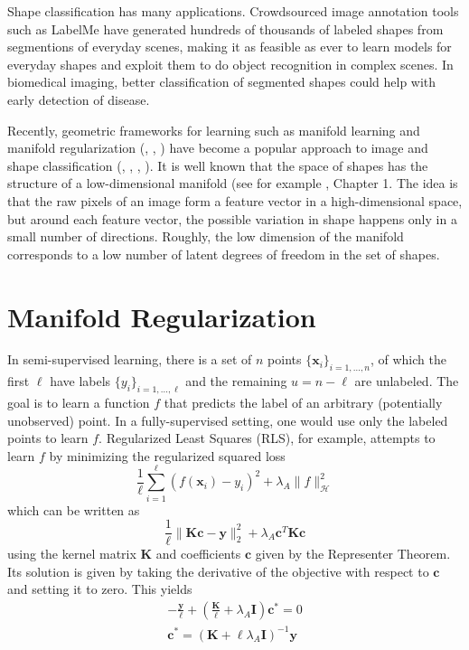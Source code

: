 \documentclass[anon,11pt]{9520} %
\newcommand{\mb}{\mathbf}
\begin{document}
Shape classification has many applications. Crowdsourced image annotation tools
such as LabelMe \cite{LabelMe} have generated hundreds of thousands of labeled
shapes from segmentions of everyday scenes, making it as feasible as ever to
learn models for everyday shapes and exploit them to do object recognition in
complex scenes. In biomedical imaging, better classification of segmented shapes
could help with early detection of disease.

Recently, geometric frameworks for learning such as manifold learning and
manifold regularization (\cite{Belkin1}, \cite{Belkin2}, \cite{Belkin3}) have become a
popular approach to image and shape classification
(\cite{sdf}, \cite{Tuzel}, \cite{Zhu}, \cite{Gong}). It is well known that the space of
shapes has the structure of a low-dimensional manifold (see for example
\cite{Haykin}, Chapter 1. The idea is that the raw pixels of an image form a
feature vector in a high-dimensional space, but around each feature vector, the
possible variation in shape happens only in a small number of
directions. Roughly, the low dimension of the manifold corresponds to a low
number of latent degrees of freedom in the set of shapes.

\begin{comment}
\begin{figure}
\begin{center}
\texttt{[image: fig/img\_overlay]}
\end{center}
\end{figure}
\end{comment}

\section{Manifold Regularization}
In semi-supervised learning, there is a set of $n$ points $\{\mb
x_i\}_{i=1,\dots,n}$, of which the first $\ell$ have labels
$\{y_i\}_{i=1,\dots,\ell}$ and the remaining $u=n-\ell$ are unlabeled. The goal
is to learn a function $f$ that predicts the label of an arbitrary (potentially
unobserved) point. In a fully-supervised setting, one would use only the labeled
points to learn $f$. Regularized Least Squares (RLS), for example, attempts to
learn $f$ by minimizing the regularized squared loss
\[\frac{1}{\ell}\sum_{i=1}^{\ell} (f(\mb{x}_i)-y_i)^2 + \lambda_A
\|f\|_{\mathcal{H}}^2\] which can be written as \[ \frac{1}{\ell}\|\mb{K}\mb{c}
- \mb{y}\|_2^2 + \lambda_A \mb{c}^T \mb{K} \mb{c} \] using the kernel matrix
$\mb{K}$ and coefficients $\mb{c}$ given by the Representer Theorem. Its
solution is given by taking the derivative of the objective with respect to $\mb
c$ and setting it to zero. This yields
\begin{gather}
-\frac{\mb y}{\ell} + \left( \frac{\mb K}{\ell} + \lambda_A \mb I\right)\mb c^* = 0\\
\mb c^* = \left(\mb K + \ell \lambda_A \mb I\right)^{-1} \mb y \label{eqn:crls}
\end{gather}
\end{document}
